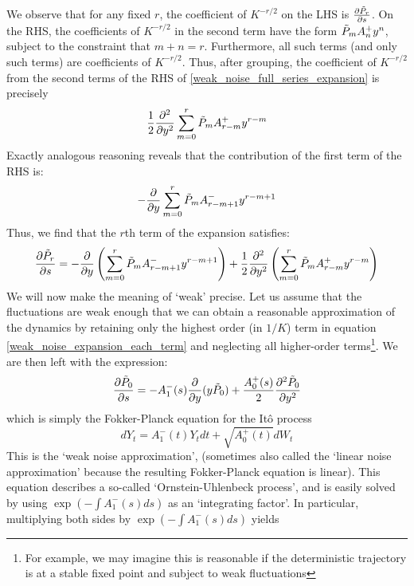 We observe that for any fixed $r$, the coefficient of $K^{-r/2}$ on the LHS is $\frac{\partial \Tilde{P}_r}{\partial s}$. On the RHS, the coefficients of $K^{-r/2}$ in the second term have the form $\Tilde{P}_{m}A^+_{n}y^n$, subject to the constraint that $m+n=r$. Furthermore, all such terms (and only such terms) are coefficients of $K^{-r/2}$. Thus, after grouping, the coefficient of $K^{-r/2}$ from the second terms of the RHS of \eqref{weak_noise_full_series_expansion} is precisely
\begin{equation*}
	\frac{1}{2}\frac{\partial^2}{\partial y^2}\sum\limits_{m=0}^{r}\Tilde{P}_{m}A^+_{r-m}y^{r-m}
\end{equation*}
Exactly analogous reasoning reveals that the contribution of the first term of the RHS is:
\begin{equation*}
	-\frac{\partial}{\partial y}\sum\limits_{m=0}^{r}\Tilde{P}_{m}A^-_{r-m+1}y^{r-m+1}
\end{equation*}
Thus, we find that the $r$th term of the expansion satisfies:
\begin{equation}
	\label{weak_noise_expansion_each_term}
	\frac{\partial \Tilde{P}_r}{\partial s} = -\frac{\partial}{\partial y}\left(\sum\limits_{m=0}^{r}\Tilde{P}_{m}A^-_{r-m+1}y^{r-m+1}\right) + \frac{1}{2}\frac{\partial^2}{\partial y^2}\left(\sum\limits_{m=0}^{r}\Tilde{P}_{m}A^+_{r-m}y^{r-m}\right)
\end{equation}
We will now make the meaning of `weak' precise. Let us assume that the fluctuations are weak enough that we can obtain a reasonable approximation of the dynamics by retaining only the highest order (in $1/K$) term in equation \eqref{weak_noise_expansion_each_term} and neglecting all higher-order terms\footnote{For example, we may imagine this is reasonable if the deterministic trajectory is at a stable fixed point and subject to weak fluctuations}. We are then left with the expression:
\begin{equation}
	\label{1D_WNA}
	\frac{\partial \Tilde{P}_0}{\partial s} = -A^-_1(s)\frac{\partial}{\partial y}(y\Tilde{P}_0) + \frac{A^+_{0}(s)}{2}\frac{\partial^2 \Tilde{P}_{0}}{\partial y^2}
\end{equation}
which is simply the Fokker-Planck equation for the It\^{o} process
\begin{equation*}
	dY_t = A^-_1(t)Y_tdt + \sqrt{A^+_0(t)}dW_t
\end{equation*}
This is the `weak noise approximation', (sometimes also called the `linear noise approximation' because the resulting Fokker-Planck equation is linear). This equation describes a so-called `Ornstein-Uhlenbeck process', and is easily solved by using $\exp(-\int A^-_1(s)ds)$ as an `integrating factor'. In particular, multiplying both sides by $\exp(-\int A^-_1(s)ds)$ yields
